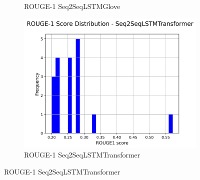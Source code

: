 \begin{figure}[H]
\begin{subfigure}{0.24\textwidth}
        \caption{ROUGE-1 Seq2SeqLSTMGlove}
    \end{subfigure}
    \hfill
    \begin{subfigure}{0.24\textwidth}
        \centering
        \includegraphics[width=\textwidth]{media/Seq2SeqLSTMTransformer_rouge1_scores.png}
        \caption{ROUGE-1 Seq2SeqLSTMTransformer}
    \end{subfigure}


\end{figure}
